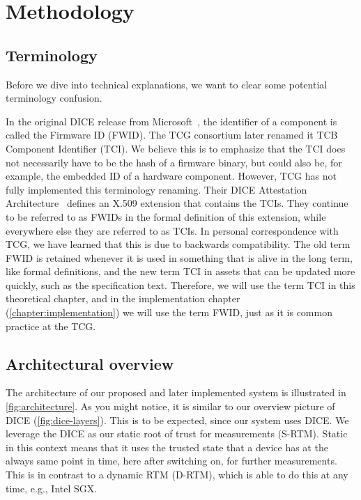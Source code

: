 
\chapter{Methodology}\label{chapter:methodology}

\section{Terminology}\label{sec:terminology}

Before we dive into technical explanations, we want to clear some potential terminology confusion.

In the original DICE release from Microsoft~\cite{England2016}, the identifier of a component is called the Firmware ID (FWID).
The TCG consortium later renamed it TCB Component Identifier (TCI).
We believe this is to emphasize that the TCI does not necessarily have to be the hash of a firmware binary, but could also be, for example, the embedded ID of a hardware component.
However, TCG has not fully implemented this terminology renaming.
Their DICE Attestation Architecture~\cite{TCGAttestation2021} defines an X.509 extension that contains the TCIs.
They continue to be referred to as FWIDs in the formal definition of this extension, while everywhere else they are referred to as TCIs.
In personal correspondence with TCG, we have learned that this is due to backwards compatibility.
The old term FWID is retained whenever it is used in something that is alive in the long term, like formal definitions, and the new term TCI in assets that can be updated more quickly, such as the specification text.
Therefore, we will use the term TCI in this theoretical chapter, and in the implementation chapter (\autoref{chapter:implementation}) we will use the term FWID, just as it is common practice at the TCG\@.



\section{Architectural overview}



The architecture of our proposed and later implemented system is illustrated in \autoref{fig:architecture}.
As you might notice, it is similar to our overview picture of DICE (\autoref{fig:dice-layers}).
This is to be expected, since our system uses DICE\@.
We leverage the DICE as our static root of trust for measurements (S-RTM).
Static in this context means that it uses the trusted state that a device has at the always same point in time, here after switching on, for further measurements.
This is in contrast to a dynamic RTM (D-RTM), which is able to do this at any time, e.g., Intel SGX\@.

